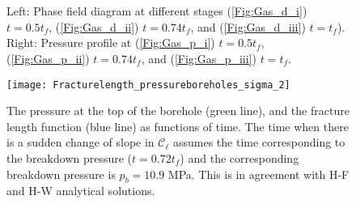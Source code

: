 



\begin{figure}[htbp]
\centering %
\\
\\
\caption{Left: Phase field diagram at different stages (\ref{Fig:Gas_d_i}) $t=0.5t_f$, (\ref{Fig:Gas_d_ii}) $t=0.74t_f$, and (\ref{Fig:Gas_d_iii}) $t=t_f$). Right: Pressure profile at (\ref{Fig:Gas_p_i}) $t=0.5t_f$, (\ref{Fig:Gas_p_ii}) $t=0.74t_f$, and (\ref{Fig:Gas_p_iii}) $t=t_f$.}
\label{Fig:Gas_snapshots}
\end{figure}




\begin{figure}
    \centering
    \texttt{[image: Fracturelength\_pressureboreholes\_sigma\_2]}
    \caption{ The pressure at the top of the borehole (green line), and the fracture length function (blue line) as functions of time. The time when there is a sudden change of slope in $\mathcal{C}_{\ell}$ assumes the time corresponding to the breakdown pressure ($t=0.72t_f$) and the corresponding breakdown pressure is $p_b =10.9$ MPa. This is in agreement with H-F and H-W analytical solutions.}
	\label{Fig:Gas_pressure_Length_Sigma_i}
\end{figure}

